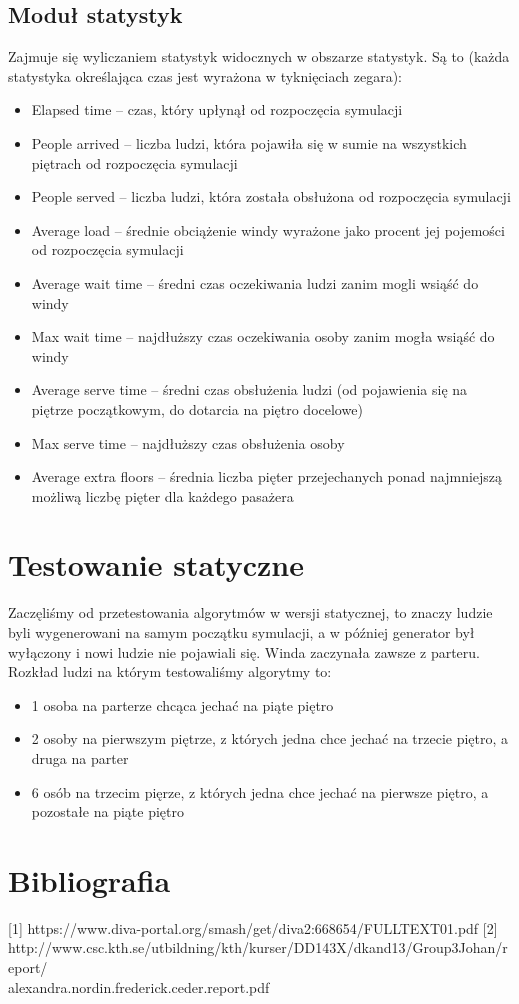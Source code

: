 \documentclass[a4paper,11pt]{article}
\begin{document}
\subsection{Moduł statystyk}
Zajmuje się wyliczaniem statystyk widocznych w obszarze statystyk. Są to (każda statystyka określająca czas jest wyrażona w tyknięciach zegara):
\begin{itemize}
	\item Elapsed time -- czas, który upłynął od rozpoczęcia symulacji
	\item People arrived -- liczba ludzi, która pojawiła się w sumie na wszystkich piętrach od rozpoczęcia symulacji
	\item People served -- liczba ludzi, która została obsłużona od rozpoczęcia symulacji
	\item Average load -- średnie obciążenie windy wyrażone jako procent jej pojemości od rozpoczęcia symulacji
	\item Average wait time -- średni czas oczekiwania ludzi zanim mogli wsiąść do windy
	\item Max wait time -- najdłuższy czas oczekiwania osoby zanim mogła wsiąść do windy
	\item Average serve time -- średni czas obsłużenia ludzi (od pojawienia się na piętrze początkowym, do dotarcia na piętro docelowe)
	\item Max serve time -- najdłuższy czas obsłużenia osoby
	\item Average extra floors -- średnia liczba pięter przejechanych ponad najmniejszą możliwą liczbę pięter dla każdego pasażera
\end{itemize}

\section{Testowanie statyczne}
Zaczęliśmy od przetestowania algorytmów w wersji statycznej, to znaczy ludzie byli wygenerowani na samym początku symulacji, a w później generator był wyłączony i nowi ludzie nie pojawiali się. Winda zaczynała zawsze z parteru. Rozkład ludzi na którym testowaliśmy algorytmy to:
\begin{itemize}
\item 1 osoba na parterze chcąca jechać na piąte piętro
\item 2 osoby na pierwszym piętrze, z których jedna chce jechać na trzecie piętro, a druga na parter
\item 6 osób na trzecim pięrze, z których jedna chce jechać na pierwsze piętro, a pozostałe na piąte piętro
\end{itemize}


\section{Bibliografia}
[1] https://www.diva-portal.org/smash/get/diva2:668654/FULLTEXT01.pdf
[2] http://www.csc.kth.se/utbildning/kth/kurser/DD143X/dkand13/Group3Johan/report/\\
\indent alexandra.nordin.frederick.ceder.report.pdf
\end{document}
